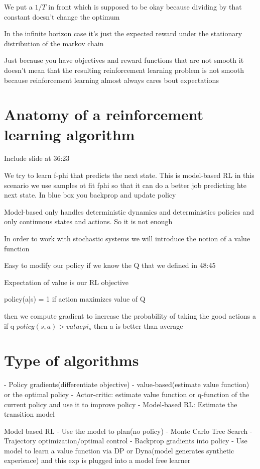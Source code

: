 \documentclass{article}
\begin{document}
We put a $1/T$ in front which is supposed to be okay because dividing by that constant doesn't change the optimum

In the infinite horizon case it's just the expected reward under the stationary distribution of the markov chain

Just because you have objectives and reward functions that are not smooth it doesn't mean that the resulting reinforcement learning problem is not smooth because reinforcement learning almost always cares bout expectations


\section{Anatomy of a reinforcement learning algorithm}

Include slide at 36:23

We try to learn f-phi that predicts the next state. This is model-based RL
in this scenario we use samples ot fit fphi so that it can do a better job predicting hte next state. In blue box you backprop and update policy

Model-based only handles deterministic dynamics and deterministics policies and only continuous states and actions. So it is not enough

In order to work with stochastic systems we will introduce the notion of a value function

Easy to modify our policy if we know the Q that we defined in 48:45

Expectation of value is our RL objective~

policy(a|s) = 1 if action maximizes value of Q

then we compute gradient to increase the probability of taking the good actions a
if q $ policy(s,a) > valuepi_s$ then a is better than average

\section{Type of algorithms}
- Policy gradients(differentiate objective)
- value-based(estimate value function) or the optimal policy
- Actor-critic: estimate  value function or q-function of the current policy and use it to improve policy
- Model-based RL: Estimate the transition model

Model based RL
- Use the model to plan(no policy)
- Monte Carlo Tree Search
- Trajectory optimization/optimal control
- Backprop gradients into policy
- Use model to learn a value function via DP or Dyna(model generates synthetic experience) and this exp is plugged into a model free learner
\end{document}
